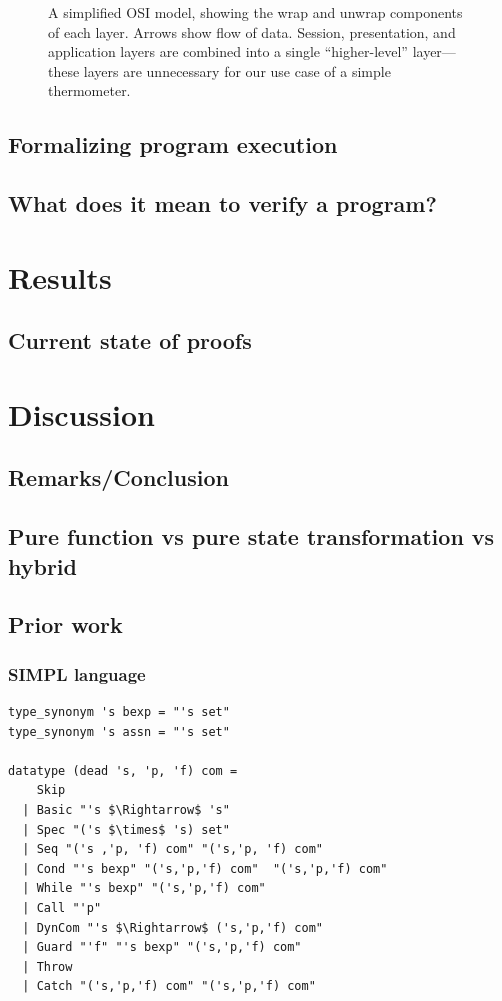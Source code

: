 \documentclass{beamer}
\begin{document}
\begin{frame}
\begin{figure}[htpb]
    
    \caption{A simplified OSI model, showing the wrap and unwrap components of each layer. Arrows show flow of data. Session, presentation, and application layers are combined into a single ``higher-level'' layer---these layers are unnecessary for our use case of a simple thermometer.}
    \label{fig:network-stack}
\end{figure}
\end{frame}

\subsection{Formalizing program execution}
\subsection{What does it mean to verify a program?}

\section{Results}
\subsection{Current state of proofs}

\section{Discussion}
\subsection{Remarks/Conclusion}
\subsection{Pure function vs pure state transformation vs hybrid}
\subsection{Prior work}




\begin{frame}[fragile]
\frametitle{SIMPL language}
\begin{lstlisting}[language=isabelle]
type_synonym 's bexp = "'s set"
type_synonym 's assn = "'s set"

datatype (dead 's, 'p, 'f) com =
    Skip
  | Basic "'s $\Rightarrow$ 's"
  | Spec "('s $\times$ 's) set"
  | Seq "('s ,'p, 'f) com" "('s,'p, 'f) com"
  | Cond "'s bexp" "('s,'p,'f) com"  "('s,'p,'f) com"
  | While "'s bexp" "('s,'p,'f) com"
  | Call "'p"
  | DynCom "'s $\Rightarrow$ ('s,'p,'f) com"
  | Guard "'f" "'s bexp" "('s,'p,'f) com"
  | Throw
  | Catch "('s,'p,'f) com" "('s,'p,'f) com"
\end{lstlisting}
\end{frame}


    
\end{document}
